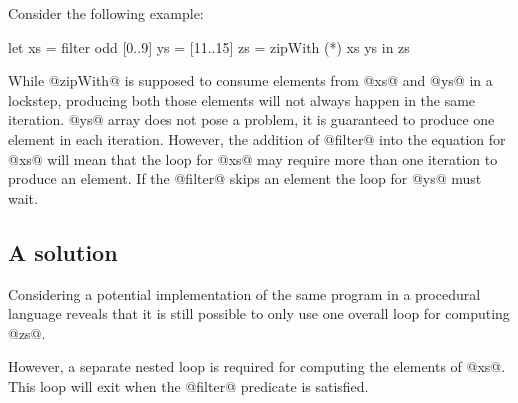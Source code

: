 \documentclass[preamble.tex]{subfiles}
\begin{document}
Consider the following example:

\begin{hscode}
let xs = filter odd [0..9]
    ys = [11..15]
    zs = zipWith (*) xs ys
in  zs
\end{hscode}

While @zipWith@ is supposed to consume elements from @xs@ and @ys@ in a lockstep, producing both those elements will not always happen in the same iteration. @ys@ array does not pose a problem, it is guaranteed to produce one element in each iteration. However, the addition of @filter@ into the equation for @xs@ will mean that the loop for @xs@ may require more than one iteration to produce an element. If the @filter@ skips an element the loop for @ys@ must wait.


\subsection{A solution}

Considering a potential implementation of the same program in a procedural language reveals that it is still possible to only use one overall loop for computing @zs@.

However, a separate nested loop is required for computing the elements of @xs@. This loop will exit when the @filter@ predicate is satisfied.
\end{document}

